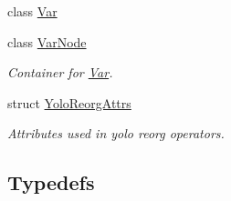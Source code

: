 \begin{DoxyCompactItemize}
class \hyperlink{classtvm_1_1relay_1_1Var}{Var}
\item 
class \hyperlink{classtvm_1_1relay_1_1VarNode}{Var\+Node}
\begin{DoxyCompactList}\small\item\em Container for \hyperlink{classtvm_1_1relay_1_1Var}{Var}. \end{DoxyCompactList}\item 
struct \hyperlink{structtvm_1_1relay_1_1YoloReorgAttrs}{Yolo\+Reorg\+Attrs}
\begin{DoxyCompactList}\small\item\em Attributes used in yolo reorg operators. \end{DoxyCompactList}\end{DoxyCompactItemize}
\subsection*{Typedefs}

